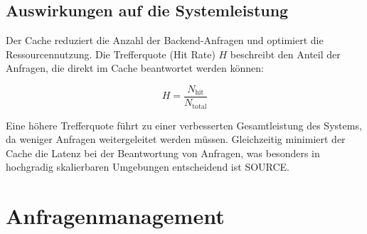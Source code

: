 \documentclass[twocolumn]{webofc}
\begin{document}
\subsection{Auswirkungen auf die Systemleistung}
Der Cache reduziert die Anzahl der Backend-Anfragen und optimiert die Ressourcennutzung. Die Trefferquote (Hit Rate) \( H \) beschreibt den Anteil der Anfragen, die direkt im Cache beantwortet werden können:

\[
H = \frac{N_{\text{hit}}}{N_{\text{total}}}
\]

Eine höhere Trefferquote führt zu einer verbesserten Gesamtleistung des Systems, da weniger Anfragen weitergeleitet werden müssen. Gleichzeitig minimiert der Cache die Latenz bei der Beantwortung von Anfragen, was besonders in hochgradig skalierbaren Umgebungen entscheidend ist {\color{red} SOURCE}.

\section{Anfragenmanagement}




\end{document}

